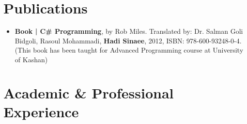 \documentclass[10pt,a4paper,roman]{moderncv}        %
\begin{document}
\makeskp
\medskip

\section{Publications}
\begin{itemize} \itemsep \mediumSpace

\item{
\textbf{Book | C\# Programming}, by Rob Miles. Translated by: Dr. Salman Goli Bidgoli, Rasoul Mohammadi, \textbf{Hadi Sinaee}, 2012, ISBN: 978-600-93248-0-4. (This book has been taught for Advanced Programming course at University of Kashan)
}

\end{itemize}

\makeskp
\medskip
\section{Academic \& Professional Experience}

\vspace{6pt}
\end{document}
